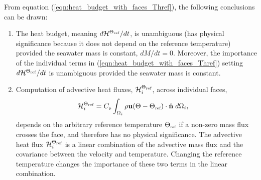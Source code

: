 \documentclass[10pt]{amsart}
\newcommand{\Cp}{C_{\mbox{\tiny p}}}
\newcommand{\surf}{\Omega}
\newcommand{\Thref}{\Theta_{\mbox{\tiny ref}}}
\newcommand{\Heat}{{\mathcal H}^{\Thref}}
\begin{document}
From equation (\ref{eqn:heat_budget_with_faces_Thref}), the following conclusions can be drawn:
\begin{enumerate}
\item The heat budget, meaning $d\Heat/ dt$, is unambiguous (has physical significance because it does not depend on the reference temperature) provided the seawater mass is constant, $dM / dt = 0$.
Moreover, the importance of the individual terms in (\ref{eqn:heat_budget_with_faces_Thref}) setting $d\Heat/ dt$ is unambiguous provided the seawater mass is constant.
\item Computation of advective heat fluxes, $\Heat_i$, across individual faces, 
\begin{align}
\Heat_i & = \Cp \int_{\surf_i} \rho {\bf u} (\Theta  - \Thref)  \cdot {\hat{\bf n}}  \; d \surf_i  , \nonumber
\end{align}
depends on the arbitrary reference temperature $\Thref$ if a non-zero mass flux crosses the face, and therefore has no physical significance.
The advective heat flux $\Heat_i$ is a linear combination of the advective mass flux and the covariance between the velocity and temperature.
Changing the reference temperature changes the importance of these two terms in the linear combination. 


\end{enumerate}
\end{document}
